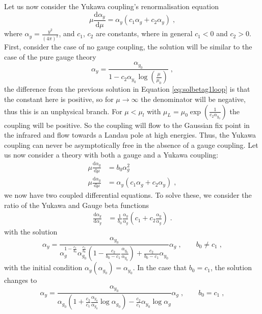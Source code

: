 Let us now consider the Yukawa coupling's renormalisation equation
\begin{equation}
    \mu \frac{\text{d}\alpha_y}{\text{d}\mu}=\alpha_y(c_1\alpha_g+c_2\alpha_y)\;,\label{eq:betay1loop}
\end{equation}
where $\alpha_y=\frac{y^2}{(4\pi)^2}$, and $c_1$, $c_2$ are constants, where in general $c_1<0$ and $c_2>0$. First, consider the case of no gauge coupling, the solution will be similar to the case of the pure gauge theory
\begin{equation}
    \alpha_y=\frac{\alpha_{y_0}}{1-c_2 \alpha_{y_0} \log \left(\frac{\mu}{\mu_0 }\right)}\;,
\end{equation}
the difference from the previous solution in Equation \ref{eq:solbetag1loop} is that the constant here is positive, so for $\mu\to\infty$ the denominator will be negative, thus this is an unphysical branch. For $\mu<\mu_l$ with $\mu_L=\mu_0\exp(\frac1{c_2\alpha_{y_0}})$ the coupling will be positive. So the coupling will flow to the Gaussian fix point in the infrared and flow towards a Landau pole at high energies. Thus, the Yukawa coupling can never be asymptotically free in the absence of a gauge coupling. 
Let us now consider a theory with both a gauge and a Yukawa coupling:
\begin{align}
    \mu \frac{\text{d}\alpha_g}{\text{d}\mu}&=b_0\alpha_g^2\\\mu \frac{\text{d}\alpha_y}{\text{d}\mu}&=\alpha_y(c_1\alpha_g+c_2\alpha_y)\;,
\end{align}
we now have two coupled differential equations. To solve these, we consider the ratio of the Yukawa and Gauge beta functions
\begin{align}
    \frac{\text{d}\alpha_y}{\text{d}\alpha_g}&=\frac{1}{b_0}\frac{\alpha_y}{\alpha_g}\left(c_1+c_2\frac{\alpha_y}{\alpha_g}\right)\;.\label{eq:betayfrac}
\end{align}
with the solution
\begin{equation}
    \alpha_y=\frac{\alpha_{y_0}}{ \alpha_g^{1-\frac{c_1}{b_0}}\alpha_{g_0}^{\frac{c_1}{b_0}}\left(1-\frac{c_2}{b_0-c_1}\frac{\alpha_{y_0}}{\alpha_{g_0}}\right)+\frac{c_2}{b_0-c_1}\alpha_{y_0} }\alpha_g\;,\quad\quad b_0\neq c_1\;,
\end{equation}
with the initial condition $\alpha_y(\alpha_{g_0})=\alpha_{y_{0}}$. In the case that $b_0=c_1$, the solution changes to 
\begin{equation}
    \alpha_y=\frac{\alpha_{y_0}}{\alpha_{g_0}\left(1+\frac{c_2}{c_1}\frac{\alpha_{y_0}}{\alpha_{g_0}}\log\alpha_{g_0}\right)-\frac{c_2}{c_1}\alpha_{y_0}\log \alpha_g }\alpha_g\;,\quad\quad b_0=c_1\;,\label{eq:ysolb0c1}
\end{equation}
